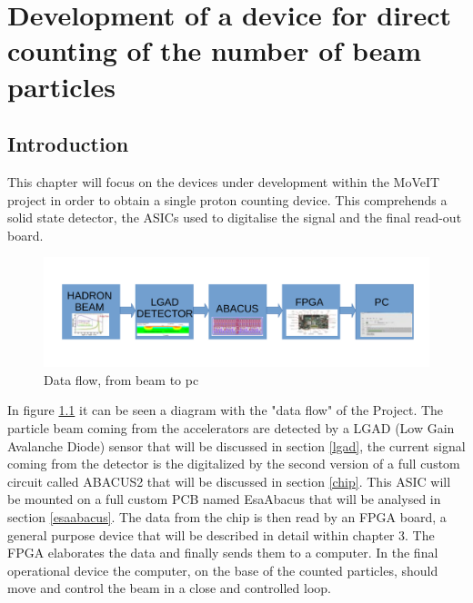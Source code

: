 \chapter{Development of a device for direct counting of the number of beam particles}

\section{Introduction}
This chapter will focus on the devices under development within the MoVeIT project in order to obtain a single proton counting device.
This comprehends a solid state detector, the ASICs used to digitalise the signal and the final read-out board.
\begin{figure}[H]
	\centering
	\includegraphics[width=0.99\linewidth]{IMG/ch2/BLOCK}
	\caption{Data flow, from beam to pc}
	\label{fig:block}
\end{figure}
\noindent In figure \ref{fig:block} it can be seen a diagram with the "data flow" of the Project.
The particle beam coming from the accelerators are detected by a LGAD (Low Gain Avalanche Diode) sensor that will be discussed in section \ref{lgad}, the current signal coming from the detector is the digitalized by the second version of a full custom circuit called ABACUS2 that will be discussed in section \ref{chip}.
This ASIC will be mounted on a full custom PCB named EsaAbacus that will be analysed in section \ref{esaabacus}.
The data from the chip is then read by an FPGA board, a general purpose device that will be described in detail within chapter 3.
The FPGA elaborates the data and finally sends them to a computer. In the final operational device the computer, on the base of the counted particles, should move and control the beam in a close and controlled loop. 

